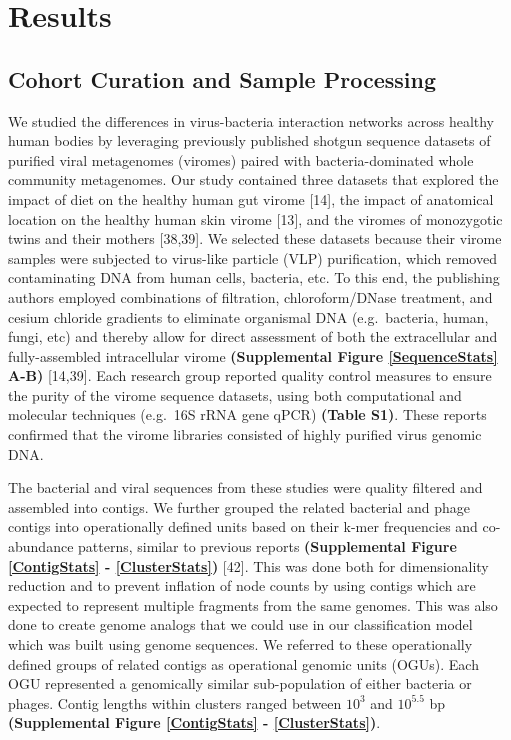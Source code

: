 \documentclass[12pt,]{article}
\begin{document}
\section{Results}\label{results}

\subsection{Cohort Curation and Sample
Processing}\label{cohort-curation-and-sample-processing}

We studied the differences in virus-bacteria interaction networks across
healthy human bodies by leveraging previously published shotgun sequence
datasets of purified viral metagenomes (viromes) paired with
bacteria-dominated whole community metagenomes. Our study contained
three datasets that explored the impact of diet on the healthy human gut
virome {[}14{]}, the impact of anatomical location on the healthy human
skin virome {[}13{]}, and the viromes of monozygotic twins and their
mothers {[}38,39{]}. We selected these datasets because their virome
samples were subjected to virus-like particle (VLP) purification, which
removed contaminating DNA from human cells, bacteria, etc. To this end,
the publishing authors employed combinations of filtration,
chloroform/DNase treatment, and cesium chloride gradients to eliminate
organismal DNA (e.g.~bacteria, human, fungi, etc) and thereby allow for
direct assessment of both the extracellular and fully-assembled
intracellular virome \textbf{(Supplemental Figure \ref{SequenceStats}
A-B)} {[}14,39{]}. Each research group reported quality control measures
to ensure the purity of the virome sequence datasets, using both
computational and molecular techniques (e.g.~16S rRNA gene qPCR)
\textbf{(Table S1)}. These reports confirmed that the virome libraries
consisted of highly purified virus genomic DNA.

The bacterial and viral sequences from these studies were quality
filtered and assembled into contigs. We further grouped the related
bacterial and phage contigs into operationally defined units based on
their k-mer frequencies and co-abundance patterns, similar to previous
reports \textbf{(Supplemental Figure \ref{ContigStats} -
\ref{ClusterStats})} {[}42{]}. This was done both for dimensionality
reduction and to prevent inflation of node counts by using contigs which
are expected to represent multiple fragments from the same genomes. This
was also done to create genome analogs that we could use in our
classification model which was built using genome sequences. We referred
to these operationally defined groups of related contigs as operational
genomic units (OGUs). Each OGU represented a genomically similar
sub-population of either bacteria or phages. Contig lengths within
clusters ranged between \(10^{3}\) and \(10^{5.5}\) bp
\textbf{(Supplemental Figure \ref{ContigStats} - \ref{ClusterStats})}.
\end{document}
